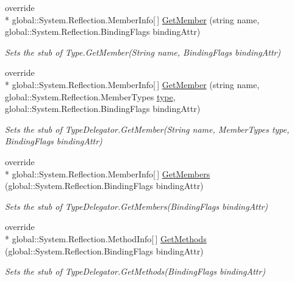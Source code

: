 \begin{DoxyCompactItemize}
override \\*
global\-::\-System.\-Reflection.\-Member\-Info\mbox{[}$\,$\mbox{]} \hyperlink{class_system_1_1_reflection_1_1_fakes_1_1_stub_type_delegator_a5670eba44a61885a862e6cda5d39c157}{Get\-Member} (string name, global\-::\-System.\-Reflection.\-Binding\-Flags binding\-Attr)
\begin{DoxyCompactList}\small\item\em Sets the stub of Type.\-Get\-Member(\-String name, Binding\-Flags binding\-Attr)\end{DoxyCompactList}\item 
override \\*
global\-::\-System.\-Reflection.\-Member\-Info\mbox{[}$\,$\mbox{]} \hyperlink{class_system_1_1_reflection_1_1_fakes_1_1_stub_type_delegator_ae082dcd8a8aa0c5c17f4bd6f62af6e1d}{Get\-Member} (string name, global\-::\-System.\-Reflection.\-Member\-Types \hyperlink{jquery-1_810_82-vsdoc_8js_a3940565e83a9bfd10d95ffd27536da91}{type}, global\-::\-System.\-Reflection.\-Binding\-Flags binding\-Attr)
\begin{DoxyCompactList}\small\item\em Sets the stub of Type\-Delegator.\-Get\-Member(\-String name, Member\-Types type, Binding\-Flags binding\-Attr)\end{DoxyCompactList}\item 
override \\*
global\-::\-System.\-Reflection.\-Member\-Info\mbox{[}$\,$\mbox{]} \hyperlink{class_system_1_1_reflection_1_1_fakes_1_1_stub_type_delegator_ae2b82e9055f2f3a4e027f9d04b28480b}{Get\-Members} (global\-::\-System.\-Reflection.\-Binding\-Flags binding\-Attr)
\begin{DoxyCompactList}\small\item\em Sets the stub of Type\-Delegator.\-Get\-Members(\-Binding\-Flags binding\-Attr)\end{DoxyCompactList}\item 
override \\*
global\-::\-System.\-Reflection.\-Method\-Info\mbox{[}$\,$\mbox{]} \hyperlink{class_system_1_1_reflection_1_1_fakes_1_1_stub_type_delegator_a26fac8d59b982e774088987d7edd7fff}{Get\-Methods} (global\-::\-System.\-Reflection.\-Binding\-Flags binding\-Attr)
\begin{DoxyCompactList}\small\item\em Sets the stub of Type\-Delegator.\-Get\-Methods(\-Binding\-Flags binding\-Attr)\end{DoxyCompactList}\item 

\end{DoxyCompactItemize}
